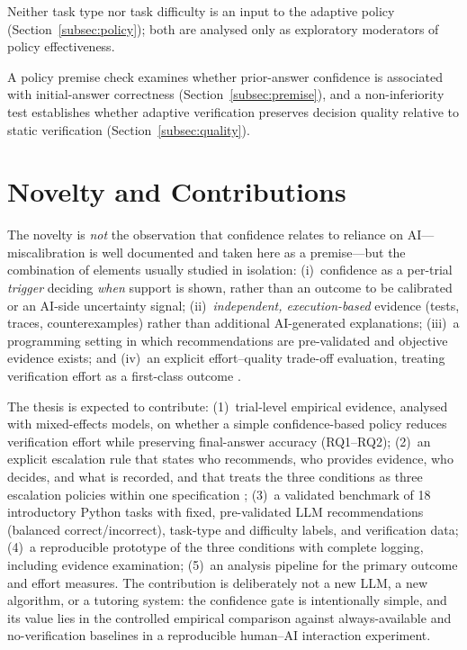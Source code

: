\documentclass[oneside,final,14pt,a4paper]{extreport}
\begin{document}
Neither task type nor task difficulty is an input to the adaptive policy
(Section~\ref{subsec:policy}); both are analysed only as exploratory
moderators of policy effectiveness.

A policy premise check examines whether prior-answer confidence is associated
with initial-answer correctness (Section~\ref{subsec:premise}), and a
non-inferiority test establishes whether adaptive verification preserves
decision quality relative to static verification
(Section~\ref{subsec:quality}).


\section{Novelty and Contributions}


The novelty is \emph{not} the observation that confidence relates to reliance
on AI---miscalibration is well documented \cite{KrugerDunning1999,Bo2025} and
taken here as a premise---but the combination of elements usually studied in
isolation: (i)~confidence as a per-trial \emph{trigger} deciding \emph{when}
support is shown, rather than an outcome to be calibrated or an AI-side
uncertainty signal; (ii)~\emph{independent, execution-based} evidence (tests,
traces, counterexamples) rather than additional AI-generated explanations;
(iii)~a programming setting in which recommendations are pre-validated and
objective evidence exists; and (iv)~an explicit effort--quality trade-off
evaluation, treating verification effort as a first-class outcome
\cite{CascadedLM2025,Zhang2024Verify}.


The thesis is expected to contribute: (1)~trial-level empirical evidence,
analysed with mixed-effects models, on whether a simple confidence-based
policy reduces verification effort while preserving final-answer accuracy
(RQ1--RQ2); (2)~an explicit escalation rule that states who recommends, who
provides evidence, who decides, and what is recorded, and that treats the three
conditions as three escalation policies within one specification
\cite{Ciancarini2027}; (3)~a validated benchmark of 18 introductory Python
tasks with fixed, pre-validated LLM recommendations (balanced
correct/incorrect), task-type and difficulty labels, and verification data;
(4)~a reproducible prototype of the three conditions with complete logging,
including evidence examination; (5)~an analysis pipeline for the primary
outcome and effort measures.
The contribution is deliberately not a new LLM, a new algorithm, or a
tutoring system: the confidence gate is intentionally simple, and its value
lies in the controlled empirical comparison against always-available and
no-verification baselines in a reproducible human--AI interaction experiment.
\end{document}

